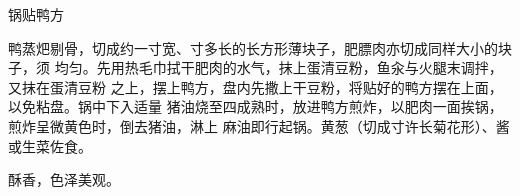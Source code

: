 %
%
%
%
%
%
%
\begin{recipe}{锅贴鸭方}

\ingredients


\preparation

鸭蒸𤆵剔骨，切成约一寸宽、寸多长的长方形薄块子，肥膘肉亦切成同样大小的块子，须
均匀。先用热毛巾拭干肥肉的水气，抹上蛋清豆粉，鱼汆与火腿末调拌，又抹在蛋清豆粉
之上，摆上鸭方，盘内先撒上干豆粉，将贴好的鸭方摆在上面，以免粘盘。锅中下入适量
猪油烧至四成熟时，放进鸭方煎炸，以肥肉一面挨锅，煎炸呈微黄色时，倒去猪油，淋上
麻油即行起锅。黄葱（切成寸许长菊花形）、酱或生菜佐食。

\features

酥香，色泽美观。

\end{recipe}

